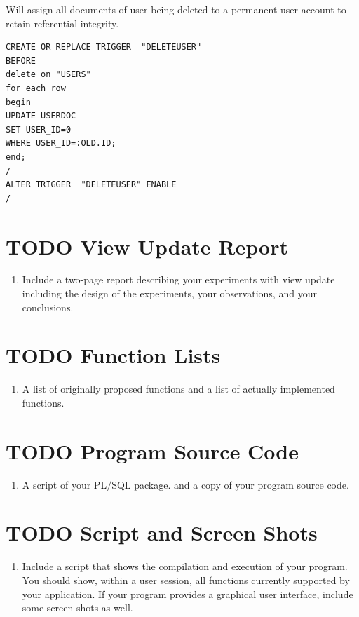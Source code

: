 \documentclass[11pt]{article}
\begin{document}
   Will assign all documents of user being deleted to a permanent user
   account to retain referential integrity.


\begin{verbatim}
CREATE OR REPLACE TRIGGER  "DELETEUSER" 
BEFORE
delete on "USERS"
for each row
begin
UPDATE USERDOC
SET USER_ID=0
WHERE USER_ID=:OLD.ID;
end;
/
ALTER TRIGGER  "DELETEUSER" ENABLE
/
\end{verbatim}
\section{\textbf{TODO} View Update Report}
\label{sec-9}

  
\begin{enumerate}
\item Include a two-page report describing your experiments with view
     update including the design of the experiments, your
     observations, and your conclusions.
\end{enumerate}
\section{\textbf{TODO} Function Lists}
\label{sec-10}

     
\begin{enumerate}
\item A list of originally proposed functions and a list of actually
     implemented functions.
\end{enumerate}
\section{\textbf{TODO} Program Source Code}
\label{sec-11}


\begin{enumerate}
\item A script of your PL/SQL package. and a copy of your program
     source code.
\end{enumerate}
\section{\textbf{TODO} Script and Screen Shots}
\label{sec-12}


\begin{enumerate}
\item Include a script that shows the compilation and execution of your
     program. You should show, within a user session, all functions
     currently supported by your application. If your program provides
     a graphical user interface, include some screen shots as well.
\end{enumerate}
\end{document}
